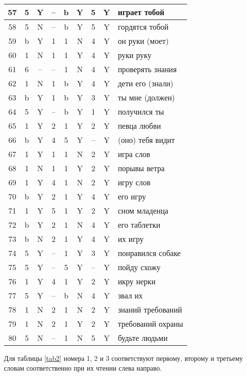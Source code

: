 \documentclass[main]{subfiles}
\begin{document}
\begin{longtable}[c]{|c|c|c|c|c|c|c|c|p{110px}|}
			57&5&Y&--&b&Y&5&Y&играет тобой\\ \hline
			58&5&N&--&b&Y&5&Y&гордятся тобой\\ \hline
			59&b&Y&1&1&N&4&Y&он руки (моет)\\ \hline
			60&1&N&1&1&Y&4&Y&руки руку \\ \hline
			61&6&--&--&1&N&4&Y&проверять знания\\ \hline
			62&1&N&1&b&Y&4& Y&дети его (знали)\\ \hline
			63&b&Y&1&b&Y&3&Y&ты мне (должен) \\ \hline
			64&5&Y&--&b&Y&1&Y&получился ты\\ \hline
			65&1&Y&2&1&Y&2&Y&певца любви\\ \hline
			66&b&Y&4&5&Y&--&Y&(оно) тебя видит\\ \hline
			67&1&Y&1&1&N&2&Y&игра слов \\ \hline
			68&1&N&1&1&Y&2&Y&порывы ветра\\ \hline
			69&1&Y&4&1&N&2&Y&игру слов\\ \hline
			70&b&Y&2&1&Y&4&Y&его игру\\ \hline
			71&1&Y&5&1&Y&2&Y&сном младенца\\ \hline
			72&b&Y&2&1&N&4&Y&его таблетки\\ \hline
			73&b&N&2&1&Y&4&Y&их игру\\ \hline
			74&5&Y&--&1&Y&3&Y&понравился собаке\\ \hline
			75&5&Y&--&5&Y&--&Y&пойду схожу\\ \hline
			76&1&Y&4&1&Y&2&Y&икру нерки\\ \hline
			77&5&Y&--&b&N&4&Y&звал их\\ \hline
			78&1&N&2&1&N&2&Y&знаний требований\\ \hline
			79&1&N&2&1&Y&2&Y&требований охраны \\ \hline
			80&5&N&--&1&N&5&Y&будьте людьми\\ \hline
\end{longtable}
Для таблицы \ref{tab2} номера 1, 2 и 3 соответствуют первому, второму и третьему словам соответственно при их чтении слева направо.
\end{document}
